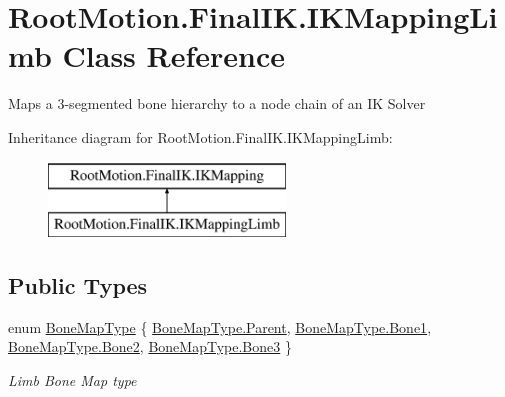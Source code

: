 \hypertarget{class_root_motion_1_1_final_i_k_1_1_i_k_mapping_limb}{}\section{Root\+Motion.\+Final\+I\+K.\+I\+K\+Mapping\+Limb Class Reference}
\label{class_root_motion_1_1_final_i_k_1_1_i_k_mapping_limb}


Maps a 3-\/segmented bone hierarchy to a node chain of an IK Solver  


Inheritance diagram for Root\+Motion.\+Final\+I\+K.\+I\+K\+Mapping\+Limb\+:\begin{figure}[H]
\begin{center}
\leavevmode
\includegraphics[height=2.000000cm]{class_root_motion_1_1_final_i_k_1_1_i_k_mapping_limb}
\end{center}
\end{figure}
\subsection*{Public Types}
\begin{DoxyCompactItemize}
\item 
enum \mbox{\hyperlink{class_root_motion_1_1_final_i_k_1_1_i_k_mapping_limb_af0c71500c2436aef8e0a11f5847efdcd}{Bone\+Map\+Type}} \{ \mbox{\hyperlink{class_root_motion_1_1_final_i_k_1_1_i_k_mapping_limb_af0c71500c2436aef8e0a11f5847efdcda30269022e9d8f51beaabb52e5d0de2b7}{Bone\+Map\+Type.\+Parent}}, 
\mbox{\hyperlink{class_root_motion_1_1_final_i_k_1_1_i_k_mapping_limb_af0c71500c2436aef8e0a11f5847efdcda289497f4c214cd9286d718460c375e1e}{Bone\+Map\+Type.\+Bone1}}, 
\mbox{\hyperlink{class_root_motion_1_1_final_i_k_1_1_i_k_mapping_limb_af0c71500c2436aef8e0a11f5847efdcdab3fbdfa2acd1c7ffc3ed8454aa3e7ce0}{Bone\+Map\+Type.\+Bone2}}, 
\mbox{\hyperlink{class_root_motion_1_1_final_i_k_1_1_i_k_mapping_limb_af0c71500c2436aef8e0a11f5847efdcdab27c83ba4dca0a2684b1789118cf36e7}{Bone\+Map\+Type.\+Bone3}}
 \}
\begin{DoxyCompactList}\small\item\em Limb Bone Map type \end{DoxyCompactList}\end{DoxyCompactItemize}
